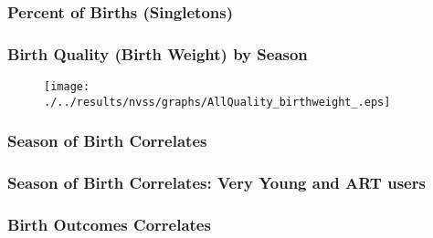 \documentclass[10pt,letterpaper,subeqn]{beamer}
\begin{document}
\begin{frame}[label=BQs]
\frametitle{Percent of Births (Singletons)}

\end{frame}








\begin{frame}[label=QBw]
\frametitle{Birth Quality (Birth Weight) by Season}
\begin{figure}[htpb!]
\centering
\label{QBwt}
\texttt{[image: ./../results/nvss/graphs/AllQuality\_birthweight\_.eps]}
\end{figure}
\end{frame}



\begin{frame}%
\frametitle{Season of Birth Correlates}

\end{frame}


\begin{frame}%
\frametitle{Season of Birth Correlates: Very Young and ART users}

\end{frame}

%

\begin{frame}%
\frametitle{Birth Outcomes Correlates}

\end{frame}

\end{document}
